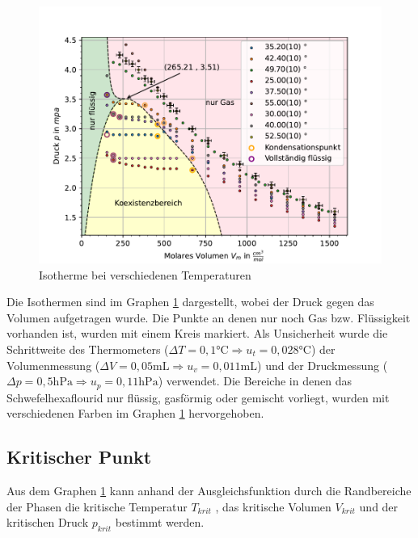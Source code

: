 \documentclass[11pt, a4paper]{article}
\begin{document}
    \begin{figure}
        \centering
        \includegraphics[width=\textwidth]{./Plots/4Plot_of_Hell.pdf}

        \caption{Isotherme bei verschiedenen Temperaturen}
        \label{fig:isotherme}
    \end{figure}
    Die Isothermen sind im Graphen \ref{fig:isotherme} dargestellt, wobei der Druck gegen das Volumen aufgetragen wurde.
    Die Punkte an denen nur noch Gas bzw. Flüssigkeit vorhanden ist, wurden mit einem Kreis markiert. Als
    Unsicherheit wurde die Schrittweite des Thermometers ($\Delta T = 0,1 \si{\celsius} \Rightarrow u_t = 0,028 \si{\celsius}$)
    der Volumenmessung ($\Delta V = 0,05 \si{\milli\liter} \Rightarrow u_v = 0,011 \si{\milli\liter}$) und der Druckmessung
    ($\Delta p = 0,5 \si{\hecto\pascal} \Rightarrow u_p = 0,11 \si{\hecto\pascal}$) verwendet.
    Die Bereiche in denen das Schwefelhexaflourid nur flüssig, gasförmig oder gemischt vorliegt, wurden mit verschiedenen
    Farben im Graphen \ref{fig:isotherme} hervorgehoben.

    \subsection{Kritischer Punkt}

    Aus dem Graphen \ref{fig:isotherme} kann anhand der Ausgleichsfunktion durch die Randbereiche der Phasen
    die kritische Temperatur $T_{krit}$ , das kritische Volumen $V_{krit}$ und der kritischen Druck $p_{krit}$ bestimmt werden.
    
\end{document}
